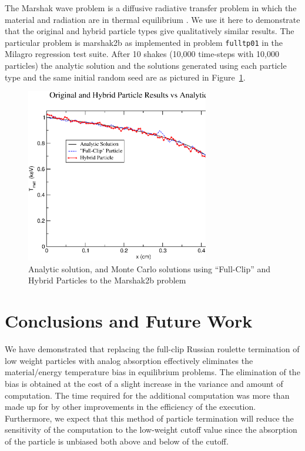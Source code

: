 \documentclass[11pt]{nmemo}
\begin{document}
The Marshak wave problem is a diffusive radiative transfer problem in
which the material and radiation are in thermal equilibrium
\cite{lams:2421}. We use it here to demonstrate that the original and
hybrid particle types give qualitatively similar results. The
particular problem is marshak2b as implemented in problem
\texttt{fulltp01} in the Milagro regression test suite. After 10
shakes (10,000 time-steps with 10,000 particles) the analytic solution
and the solutions generated using each particle type and the same
initial random seed are as pictured in Figure~\ref{fig:marshak2b}.

\vspace{1em}
\begin{figure}[h]
  \centerline{\includegraphics[height=3.0in]{plot}}
  \caption{Analytic solution, and Monte Carlo solutions using ``Full-Clip''
    and Hybrid Particles to the Marshak2b problem}
  \label{fig:marshak2b}
\end{figure}

\section{Conclusions and Future Work}

We have demonstrated that replacing the full-clip Russian roulette
termination of low weight particles with analog absorption effectively
eliminates the material/energy temperature bias in equilibrium
problems. The elimination of the bias is obtained at the cost of a
slight increase in the variance and amount of computation.  The time
required for the additional computation was more than made up for by
other improvements in the efficiency of the execution.  Furthermore,
we expect that this method of particle termination will reduce the
sensitivity of the computation to the low-weight cutoff value since
the absorption of the particle is unbiased both above and below of the
cutoff.
\end{document}
